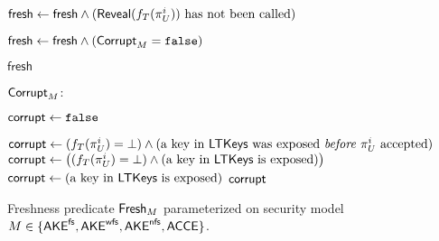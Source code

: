 \begin{figure}
{\begin{minipage}[t]{1\textwidth}
\begin{algorithmic}[1]
			\State {}
			\State $\mathsf{fresh} \gets \mathsf{fresh} \land (\Reveal(f_T(\oracle[U][i])) \text{ has not been called})$ \label{code:fresh:reveal_partner}
			
			\State {}
			\State $\mathsf{fresh} \gets \mathsf{fresh} \land (\mathsf{Corrupt}_M = \mathtt{false})$ \label{code:fresh:corrupt}
			
			\State
			\State \Return $\mathsf{fresh}$
		
			\Statex
			

		
		
		
		
		\end{algorithmic}
		
		\underline{$\mathsf{Corrupt}_M$}:
		\begin{algorithmic}[1]
		
			\State $\mathsf{corrupt} \gets \mathtt{false}$
		
				\State $\corrupted \gets 
				(f_T(\oracle[U][i]) = \bot) \land (\text{a key in } \mathsf{LTKeys} \text{ was exposed \emph{before} } \oracle[U][i] \text{ accepted})$  \label{code:fresh:corrupt:AKEfs}
			\EndIf
				\State $\corrupted \gets  
				\left( (f_T(\oracle[U][i]) = \bot) \land (\text{a key in } \mathsf{LTKeys} \text{ is exposed}) \right)$ \label{code:fresh:corrupt:AKEwfs}
			\EndIf
				\State $\mathsf{corrupt} \gets \left( \text{a key in } \mathsf{LTKeys} \text{ is exposed} \right)$ \label{code:fresh:corrupt:AKEnfs}
			\EndIf
			\State \Return $\mathsf{corrupt}$
		\end{algorithmic}
	\end{minipage}
}


\caption{Freshness predicate $\mathsf{Fresh}_{M}$ parameterized on  security model $M \in \lbrace \mathsf{AKE}^{\mathsf{fs}}, \allowbreak \mathsf{AKE}^{\mathsf{wfs}}, \allowbreak \mathsf{AKE}^{\mathsf{nfs}}, \allowbreak \mathsf{ACCE} \rbrace$.
}
\label{fig:freshness:AKE}

\end{figure}






